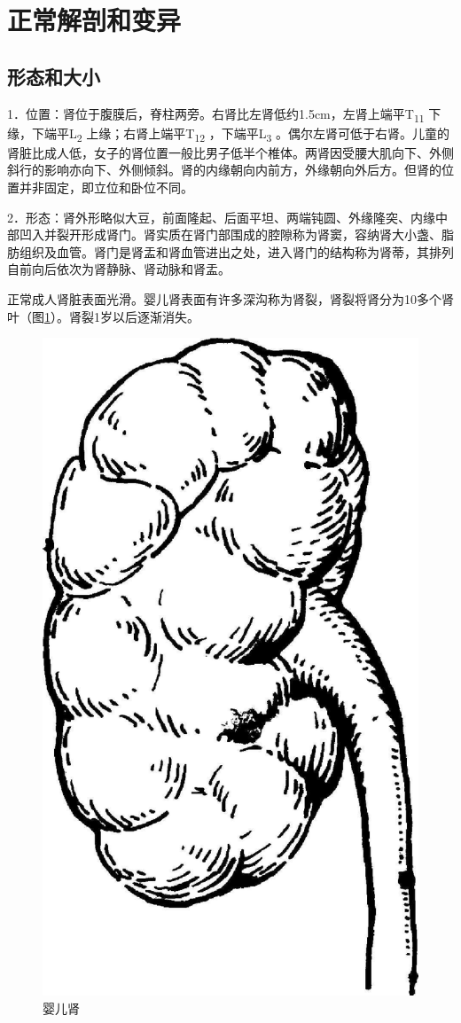 \section{正常解剖和变异}

\subsection{形态和大小}

1．位置：肾位于腹膜后，脊柱两旁。右肾比左肾低约1.5cm，左肾上端平T\textsubscript{11}
下缘，下端平L\textsubscript{2} 上缘；右肾上端平T\textsubscript{12}
，下端平L\textsubscript{3}
。偶尔左肾可低于右肾。儿童的肾脏比成人低，女子的肾位置一般比男子低半个椎体。两肾因受腰大肌向下、外侧斜行的影响亦向下、外侧倾斜。肾的内缘朝向内前方，外缘朝向外后方。但肾的位置并非固定，即立位和卧位不同。

2．形态：肾外形略似大豆，前面隆起、后面平坦、两端钝圆、外缘隆突、内缘中部凹入并裂开形成肾门。肾实质在肾门部围成的腔隙称为肾窦，容纳肾大小盏、脂肪组织及血管。肾门是肾盂和肾血管进出之处，进入肾门的结构称为肾蒂，其排列自前向后依次为肾静脉、肾动脉和肾盂。

正常成人肾脏表面光滑。婴儿肾表面有许多深沟称为肾裂，肾裂将肾分为10多个肾叶（图\ref{fig15-2}）。肾裂1岁以后逐渐消失。

\begin{figure}[!htbp]
 \centering
 \includegraphics[width=.7\textwidth,height=\textheight,keepaspectratio]{./images/Image00317.jpg}
 \captionsetup{justification=centering}
 \caption{婴儿肾}
 \label{fig15-2}
  \end{figure} 

